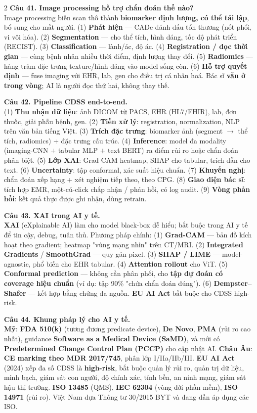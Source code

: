 \begin{paracol}{2}
\textbf{Câu 41. Image processing hỗ trợ chẩn đoán thế nào?}\\
Image processing biến scan thô thành \textbf{biomarker định lượng, có thể tái lập}, bổ sung cho mắt người. (1) \textbf{Phát hiện} — CADe đánh dấu tổn thương (nốt phổi, vi vôi hóa). (2) \textbf{Segmentation} — cho thể tích, hình dáng, tốc độ phát triển (RECIST). (3) \textbf{Classification} — lành/ác, độ ác. (4) \textbf{Registration / dọc thời gian} — cùng bệnh nhân nhiều thời điểm, định lượng thay đổi. (5) \textbf{Radiomics} — hàng trăm đặc trưng texture/hình dáng vào model sống còn. (6) \textbf{Hỗ trợ quyết định} — fuse imaging với EHR, lab, gen cho điều trị cá nhân hoá. Bác sĩ \textbf{vẫn ở trong vòng}; AI là người đọc thứ hai, không thay thế.

\textbf{Câu 42. Pipeline CDSS end-to-end.}\\
(1) \textbf{Thu nhận dữ liệu}: ảnh DICOM từ PACS, EHR (HL7/FHIR), lab, đơn thuốc, giải phẫu bệnh, gen. (2) \textbf{Tiền xử lý}: registration, normalization, NLP trên văn bản tiếng Việt. (3) \textbf{Trích đặc trưng}: biomarker ảnh (segment $\to$ thể tích, radiomics) + đặc trưng cấu trúc. (4) \textbf{Inference}: model đa modality (imaging-CNN $+$ tabular MLP $+$ text BERT) ra điểm rủi ro hoặc chẩn đoán phân biệt. (5) \textbf{Lớp XAI}: Grad-CAM heatmap, SHAP cho tabular, trích dẫn cho text. (6) \textbf{Uncertainty}: tập conformal, xác suất hiệu chuẩn. (7) \textbf{Khuyến nghị}: chẩn đoán xếp hạng + xét nghiệm tiếp theo, theo CPG. (8) \textbf{Giao diện bác sĩ}: tích hợp EMR, một-cú-click chấp nhận / phản hồi, có log audit. (9) \textbf{Vòng phản hồi}: kết quả thực được ghi nhận, dùng retrain.

\textbf{Câu 43. XAI trong AI y tế.}\\
\textbf{XAI} (eXplainable AI) làm cho model black-box dễ hiểu; bắt buộc trong AI y tế để tin cậy, debug, tuân thủ. Phương pháp chính: (1) \textbf{Grad-CAM} — bản đồ kích hoạt theo gradient; heatmap "vùng mạng nhìn" trên CT/MRI. (2) \textbf{Integrated Gradients} / \textbf{SmoothGrad} — quy gán pixel. (3) \textbf{SHAP / LIME} — model-agnostic, phổ biến cho EHR tabular. (4) \textbf{Attention rollout} cho ViT. (5) \textbf{Conformal prediction} — không cần phân phối, cho \textbf{tập dự đoán có coverage hiệu chuẩn} (ví dụ: tập 90\% "chứa chẩn đoán đúng"). (6) \textbf{Dempster--Shafer} — kết hợp bằng chứng đa nguồn. \textbf{EU AI Act} bắt buộc cho CDSS high-risk.

\textbf{Câu 44. Khung pháp lý cho AI y tế.}\\
\textbf{Mỹ}: \textbf{FDA 510(k)} (tương đương predicate device), \textbf{De Novo}, \textbf{PMA} (rủi ro cao nhất), guidance \textbf{Software as a Medical Device (SaMD)}, và mới có \textbf{Predetermined Change Control Plan (PCCP)} cho cập nhật AI. \textbf{Châu Âu}: \textbf{CE marking theo MDR 2017/745}, phân lớp I/IIa/IIb/III. \textbf{EU AI Act} (2024) xếp đa số CDSS là \textbf{high-risk}, bắt buộc quản lý rủi ro, quản trị dữ liệu, minh bạch, giám sát con người, độ chính xác, tính bền, an ninh mạng, giám sát hậu thị trường. \textbf{ISO 13485} (QMS), \textbf{IEC 62304} (vòng đời phần mềm), \textbf{ISO 14971} (rủi ro). Việt Nam dựa Thông tư 30/2015 BYT và đang dần áp dụng các ISO.


\end{paracol}
